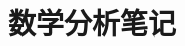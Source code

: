 \documentclass[b5paper]{ctexrep}
\begin{document}
\title{数学分析笔记}
\author{\Large \Caffein}
\predate{}
\postdate{}
\date{}
\maketitle
\tableofcontents


\end{document}
